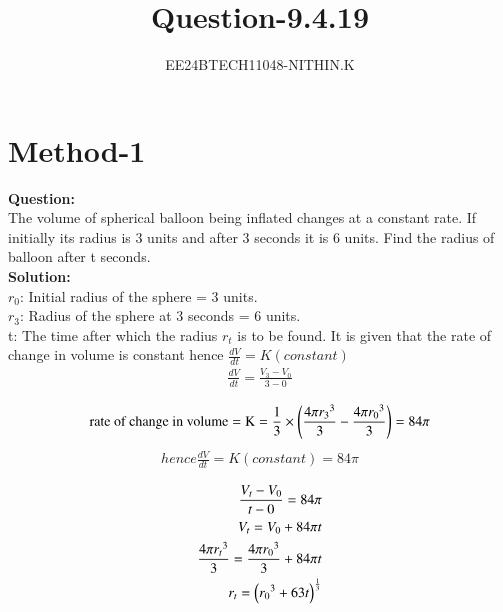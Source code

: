 \documentclass[journal]{IEEEtran}
\numberwithin{equation}{enumi}
\numberwithin{figure}{enumi}
\begin{document}


\title{Question-9.4.19}
\author{EE24BTECH11048-NITHIN.K} 
{\let\newpage\relax\maketitle}
\section{Method-1}
\textbf{Question:} \\
  The volume of spherical balloon being inflated changes at a constant rate. If initially its radius is 3 units and after 3 seconds it is 6 units. Find the radius of balloon after t seconds. \\ 

\textbf{Solution:} \\
$r_0$: Initial radius of the sphere = 3 units. \\
$r_3$: Radius of the sphere at 3 seconds = 6 units. \\
t: The time after which the radius $r_t$ is to be found.
  It is given that the rate of change in volume is constant hence $\frac{dV}{dt} = K(constant)$ \\
  \begin{align*}
	  \frac{dV}{dt} = \frac{V_3 - V_0}{3-0} \\
  \end{align*}
  \begin{align*}
	  \text{rate of change in volume} = \text{K} = \frac{1}{3} \times \left(\frac{4\pi {r_3}^3}{3} - \frac{4\pi {r_0}^3}{3}\right) = 84\pi \\
  \end{align*}
  \begin{align*}
	  hence \frac{dV}{dt} = K(constant) = 84\pi \\
  \end{align*}
  \begin{align*}
	  \frac{V_t - V_0}{t-0} = 84\pi \\
	  V_t = V_0 + 84\pi t \\
	  \frac{4\pi {r_t}^3}{3} = \frac{4\pi {r_0}^3}{3} + 84\pi t \\ 
	  r_t = \left({r_0}^3 + 63t\right)^{\frac{1}{3}}
  \end{align*}
\end{document}
